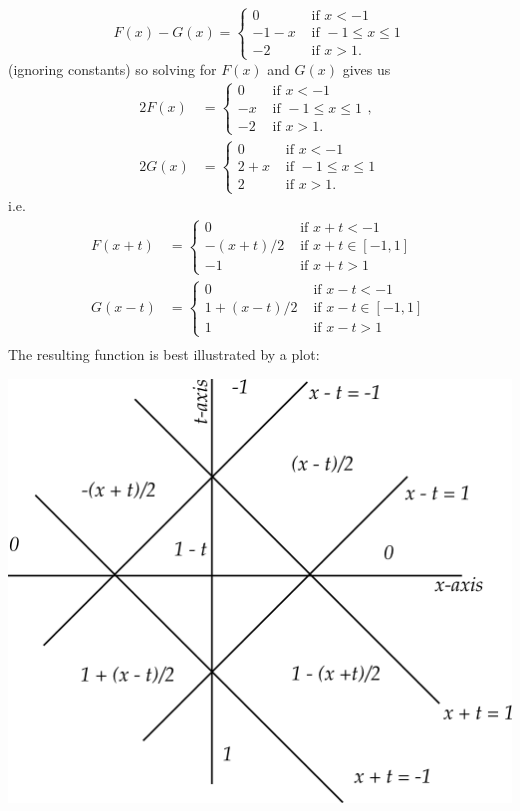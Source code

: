 \documentclass[12pt]{article}
\begin{document}
\begin{answer}
\begin{enumerate}[(a)]
\[F(x)-G(x)=\begin{cases}
0&\mbox{ if }x<-1\\
-1-x&\mbox{ if }-1\leq x\leq 1\\
-2&\mbox{ if }x>1.
\end{cases}\]
(ignoring constants) so solving for $F(x)$ and $G(x)$ gives us
\begin{align*}
2F(x)&=\begin{cases}
0&\mbox{ if }x<-1\\
-x&\mbox{ if }-1\leq x\leq 1\\
-2&\mbox{ if }x>1.
\end{cases},\\
2G(x)&=\begin{cases}
0&\mbox{ if }x<-1\\
2+x&\mbox{ if }-1\leq x\leq 1\\
2&\mbox{ if }x>1.
\end{cases}
\end{align*}
i.e.
\begin{align*}
F(x+t)&=\begin{cases}0&\mbox{ if }x+t<-1\\
-(x+t)/2&\mbox{ if }x+t\in[-1,1]\\
-1&\mbox{ if }x+t>1
\end{cases}\\
G(x-t)&=\begin{cases}0&\mbox{ if }x-t<-1\\
1+(x-t)/2&\mbox{ if }x-t\in[-1,1]\\
1&\mbox{ if }x-t>1
\end{cases}\\
\end{align*}
The resulting function is best illustrated by a plot:
\begin{center}
\includegraphics{qun-sh7-1d.png}
\end{center}
\end{enumerate}
\end{answer}
\newpage
\fi
\end{document}
